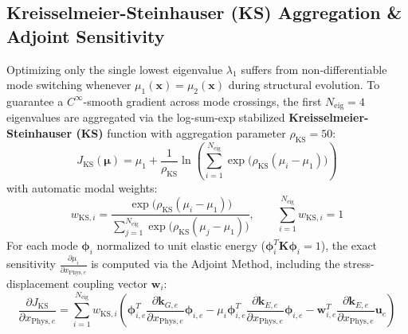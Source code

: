 \documentclass[11pt, a4paper]{article}
\begin{document}
\subsection{Kreisselmeier-Steinhauser (KS) Aggregation \& Adjoint Sensitivity}
Optimizing only the single lowest eigenvalue $\lambda_1$ suffers from non-differentiable mode switching whenever $\mu_1(\mathbf{x}) = \mu_2(\mathbf{x})$ during structural evolution. To guarantee a $C^\infty$-smooth gradient across mode crossings, the first $N_{\text{eig}} = 4$ eigenvalues are aggregated via the log-sum-exp stabilized \textbf{Kreisselmeier-Steinhauser (KS)} function with aggregation parameter $\rho_{\text{KS}} = 50$:
\begin{equation}
    J_{\text{KS}}(\boldsymbol{\mu}) = \mu_1 + \frac{1}{\rho_{\text{KS}}} \ln \left( \sum_{i=1}^{N_{\text{eig}}} \exp\!\big(\rho_{\text{KS}} (\mu_i - \mu_1)\big) \right)
\end{equation}
with automatic modal weights:
\begin{equation}
    w_{\text{KS}, i} = \frac{\exp\!\big(\rho_{\text{KS}} (\mu_i - \mu_1)\big)}{\sum_{j=1}^{N_{\text{eig}}} \exp\!\big(\rho_{\text{KS}} (\mu_j - \mu_1)\big)}, \qquad \sum_{i=1}^{N_{\text{eig}}} w_{\text{KS}, i} = 1
\end{equation}
For each mode $\boldsymbol{\phi}_i$ normalized to unit elastic energy ($\boldsymbol{\phi}_i^T \mathbf{K} \boldsymbol{\phi}_i = 1$), the exact sensitivity $\frac{\partial \mu_i}{\partial x_{\text{Phys}, e}}$ is computed via the Adjoint Method, including the stress-displacement coupling vector $\mathbf{w}_i$:
\begin{equation}
    \frac{\partial J_{\text{KS}}}{\partial x_{\text{Phys}, e}} = \sum_{i=1}^{N_{\text{eig}}} w_{\text{KS}, i} \left( \boldsymbol{\phi}_{i,e}^T \frac{\partial \mathbf{k}_{G,e}}{\partial x_{\text{Phys}, e}} \boldsymbol{\phi}_{i,e} - \mu_i \boldsymbol{\phi}_{i,e}^T \frac{\partial \mathbf{k}_{E,e}}{\partial x_{\text{Phys}, e}} \boldsymbol{\phi}_{i,e} - \mathbf{w}_{i,e}^T \frac{\partial \mathbf{k}_{E,e}}{\partial x_{\text{Phys}, e}} \mathbf{u}_e \right)
\end{equation}
\end{document}
